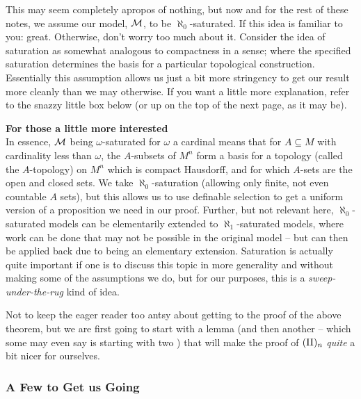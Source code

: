 \begin{remark}
This may seem completely apropos of nothing, but now and for the rest of these notes, we assume our model, $\mathcal{M}$, to be $\aleph_0$-saturated. If this idea is familiar to you: great. Otherwise, don't worry too much about it. Consider the idea of saturation as somewhat analogous to compactness in a sense; where the specified saturation determines the basis for a particular topological construction. Essentially this assumption allows us just a bit more stringency to get our result more cleanly than we may otherwise. If you want a little more explanation, refer to the snazzy little box below (or up on the top of the next page, as it may be).
\end{remark}

\pagebreak

\begin{svgraybox}
  \textbf{For those a little more interested} \\
  In essence, $\mathcal{M}$ being $\omega$-saturated for $\omega$ a cardinal means that for $A \subseteq M$ with cardinality less than $\omega$, the $A$- subsets of $M^n$ form a basis for a topology (called the $A$-topology) on $M^n$ which is compact Hausdorff, and for which $A$- sets are the open and closed sets. We take $\aleph_0$-saturation (allowing only finite, not even countable $A$ sets), but this allows us to use definable selection to get a uniform version of a proposition we need in our proof. Further, but not relevant here, $\aleph_0$-saturated models can be elementarily extended to $\aleph_1$-saturated models, where work can be done that may not be possible in the original model -- but can then be applied back due to being an elementary extension. Saturation is actually quite important if one is to discuss this topic in more generality and without making some of the assumptions we do, but for our purposes, this is a \textit{sweep-under-the-rug} kind of idea.
\end{svgraybox}

Not to keep the eager reader too antsy about getting to the proof of the above theorem, but we are first going to start with a lemma (and then another -- which some may even say is starting with two \lemmas) that will make the proof of $(\textrm{II})_{n}$ \emph{quite} a bit nicer for ourselves.

\subsubsection{A Few \Lemmas to Get us Going}

